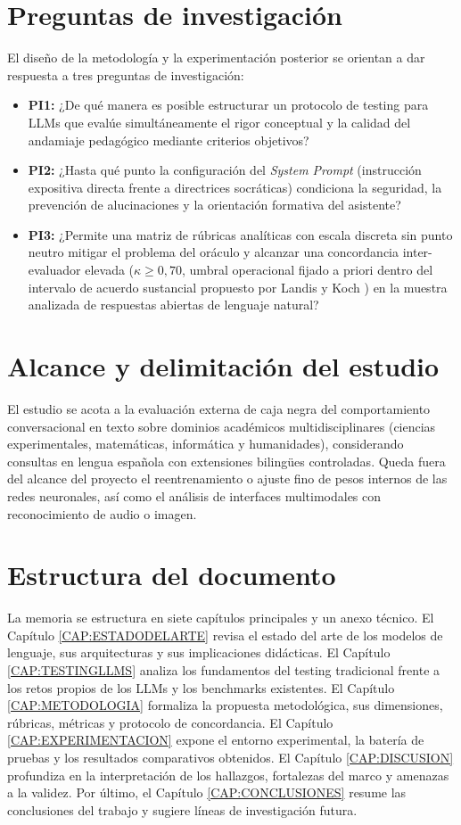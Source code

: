 \section{Preguntas de investigación}
\label{sec:preguntas_investigacion}
El diseño de la metodología y la experimentación posterior se orientan a dar respuesta a tres preguntas de investigación:
\begin{itemize}
    \item \textbf{PI1:} ¿De qué manera es posible estructurar un protocolo de testing para LLMs que evalúe simultáneamente el rigor conceptual y la calidad del andamiaje pedagógico mediante criterios objetivos?
    \item \textbf{PI2:} ¿Hasta qué punto la configuración del \textit{System Prompt} (instrucción expositiva directa frente a directrices socráticas) condiciona la seguridad, la prevención de alucinaciones y la orientación formativa del asistente?
    \item \textbf{PI3:} ¿Permite una matriz de rúbricas analíticas con escala discreta sin punto neutro mitigar el problema del oráculo y alcanzar una concordancia inter-evaluador elevada ($\kappa \ge 0{,}70$, umbral operacional fijado a priori dentro del intervalo de acuerdo sustancial propuesto por Landis y Koch \cite{landis1977measurement}) en la muestra analizada de respuestas abiertas de lenguaje natural?
\end{itemize}

\section{Alcance y delimitación del estudio}
\label{sec:alcance_limitaciones}
El estudio se acota a la evaluación externa de caja negra del comportamiento conversacional en texto sobre dominios académicos multidisciplinares (ciencias experimentales, matemáticas, informática y humanidades), considerando consultas en lengua española con extensiones bilingües controladas. Queda fuera del alcance del proyecto el reentrenamiento o ajuste fino de pesos internos de las redes neuronales, así como el análisis de interfaces multimodales con reconocimiento de audio o imagen.

\section{Estructura del documento}
\label{sec:estructura_documento}
La memoria se estructura en siete capítulos principales y un anexo técnico. El Capítulo \ref{CAP:ESTADODELARTE} revisa el estado del arte de los modelos de lenguaje, sus arquitecturas y sus implicaciones didácticas. El Capítulo \ref{CAP:TESTINGLLMS} analiza los fundamentos del testing tradicional frente a los retos propios de los LLMs y los benchmarks existentes. El Capítulo \ref{CAP:METODOLOGIA} formaliza la propuesta metodológica, sus dimensiones, rúbricas, métricas y protocolo de concordancia. El Capítulo \ref{CAP:EXPERIMENTACION} expone el entorno experimental, la batería de pruebas y los resultados comparativos obtenidos. El Capítulo \ref{CAP:DISCUSION} profundiza en la interpretación de los hallazgos, fortalezas del marco y amenazas a la validez. Por último, el Capítulo \ref{CAP:CONCLUSIONES} resume las conclusiones del trabajo y sugiere líneas de investigación futura.
